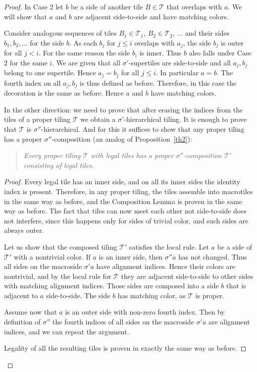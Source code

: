 \documentclass[12pt]{article}
\theoremstyle{remark}
\begin{document}
\begin{proof}
In Case 2 let $b$ be a side of another tile $B\in\mathcal T$
that overlaps with $a$.
We will show that $a$ and $b$ are adjacent side-to-side and have matching colors.

Consider analogous sequences of tiles $B_1\in \mathcal T_1$,  $B_2\in\mathcal T_2$, $\dots$ and their sides $b_1,b_2,\dots$ for the side $b$. 
As each $b_j$ for $j\le i$ overlaps with $a_j$, the side  $b_j$
is outer for all $j<i$. For the same reason the side $b_i$ is inner.  Thus  $b$ also falls under Case 2 for the same $i$.
We are given that all $\sigma'$-supertiles are side-to-side and all $a_j,b_j$ belong to one supertile. 
Hence  $a_j=b_j$ for all $j\le i$. In particular $a=b$.
The fourth index on all $a_j,b_j$ 
is thus defined as before. Therefore, in this case the decoration is the same as before.
Hence $a$ and $b$ have matching colors.


In the other direction: we need to prove that after erasing the indices from the tiles
of a proper tiling $\mathcal T$ we obtain a $\sigma'$-hierarchical tiling. 
It is enough to prove that $\mathcal T$ is $\sigma''$-hierarchical. And for this it 
suffices to show that any proper tiling has a proper $\sigma''$-composition (an analog of Proposition~\ref{th2}):
\begin{quote} 
\emph{Every proper tiling $\mathcal T$ with legal tiles has a 
proper $\sigma''$-composition $\mathcal T'$ consisting of legal tiles.}
 \end{quote}
\begin{proof}
Every legal tile has an inner side, and on all its inner sides
the identity index is present. Therefore, in any
proper tiling, the tiles assemble into macrotiles in the same way as before, and the Composition Lemma
is proven in the same way as before. The fact that tiles can now meet each other not side-to-side does not interfere,
since this happens only for sides of trivial color, and such sides are always outer.

Let us show that the composed tiling $\mathcal T'$ satisfies the local rule.
Let $a$ be a side of $\mathcal T'$ with a nontrivial color. If $a$ is an inner side, then 
$\sigma'' a$ has not changed. Thus all sides on the macroside
$\sigma' a$ have alignment indices. Hence their colors
are nontrivial, and by the local rule for $\mathcal T$ they are adjacent side-to-side to 
other sides with matching alignment indices. Those sides are composed into a side $b$
that is adjacent to $a$ side-to-side. The side $b$ has matching color, as  $\mathcal T$ is proper.


Assume now that $a$ is an outer side  with non-zero fourth index.
Then by definition of $\sigma''$ the fourth indices of all sides on the macroside $\sigma' a$
are alignment indices, and we can repeat the argument.


Legality of all the resulting tiles is proven in exactly the same way as before.
\end{proof}
\end{proof}
\end{document}
